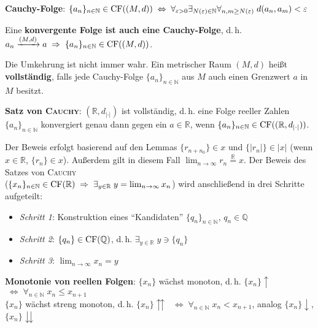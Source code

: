 \textbf{Cauchy-Folge}:
$\{a_n\}_{n \in \mathbb{N}} \in \operatorname{CF}((M,d)) \;\Leftrightarrow\;
\forall_{\varepsilon > 0} \exists_{N(\varepsilon) \in \mathbb{N}}
\forall_{n,m \ge N(\varepsilon)}\; d(a_n, a_m) < \varepsilon$

Eine \textbf{konvergente Folge ist auch eine Cauchy-Folge}, d.\,h. \\
$a_n \xrightarrow{(M,d)} a \;\Rightarrow\;
\{a_n\}_{n \in \mathbb{N}} \in \operatorname{CF}((M,d))$.

\pagebreak

Die Umkehrung ist nicht immer wahr. Ein metrischer Raum $(M,d)$ heißt
\textbf{vollständig}, falls jede Cauchy-Folge $\{a_n\}_{n \in \mathbb{N}}$
aus $M$ auch einen Grenzwert $a$ in $M$ besitzt.

\linie

\textbf{Satz von \textsc{Cauchy}}: $(\mathbb{R},d_{|\cdot|})$ ist vollständig,
d.\,h. eine Folge reeller Zahlen $\{a_n\}_{n \in \mathbb{N}}$ konvergiert genau
dann gegen ein $a \in \mathbb{R}$, wenn
$\{a_n\}_{n \in \mathbb{N}} \in \operatorname{CF}((\mathbb{R},d_{|\cdot|}))$.

Der Beweis erfolgt basierend auf den Lemmas $\{r_{n+n_0}\} \in x$ und
$\{|r_n|\} \in |x|$ (wenn $x \in \mathbb{R}$, $\{r_n\} \in x$). Außerdem
gilt in diesem Fall $\lim_{n \to \infty} r_n \overset{\mathbb{R}}{=} x$. Der
Beweis des Satzes von \textsc{Cauchy} \\
($\{x_n\}_{n \in \mathbb{N}} \in \operatorname{CF}(\mathbb{R}) \;\Rightarrow\;
\exists_{y \in \mathbb{R}}\; y = \lim_{n \to \infty} x_n$)
wird anschließend in drei Schritte aufgeteilt:

\begin{itemize}
    \item \emph{Schritt 1}: Konstruktion eines "`Kandidaten"'
    $\{q_n\}_{n \in \mathbb{N}}$, $q_n \in \mathbb{Q}$

    \item \emph{Schritt 2}: $\{q_n\} \in \operatorname{CF}(\mathbb{Q})$, d.\,h.
    $\exists_{y \in \mathbb{R}}\; y \ni \{q_n\}$

    \item \emph{Schritt 3}: $\lim_{n \to \infty} x_n = y$
\end{itemize}

\linie

\textbf{Monotonie von reellen Folgen}:
$\{x_n\}$ wächst monoton, d.\,h. $\{x_n\}\!\!\uparrow$
$\;\Leftrightarrow\; \forall_{n \in \mathbb{N}}\; x_n \le x_{n+1}$ \\
$\{x_n\}$ wächst streng monoton, d.\,h. $\{x_n\}\!\!\upuparrows$
$\;\Leftrightarrow\; \forall_{n \in \mathbb{N}}\; x_n < x_{n+1}$,
analog $\{x_n\}\!\!\downarrow$, $\{x_n\}\!\!\downdownarrows$

